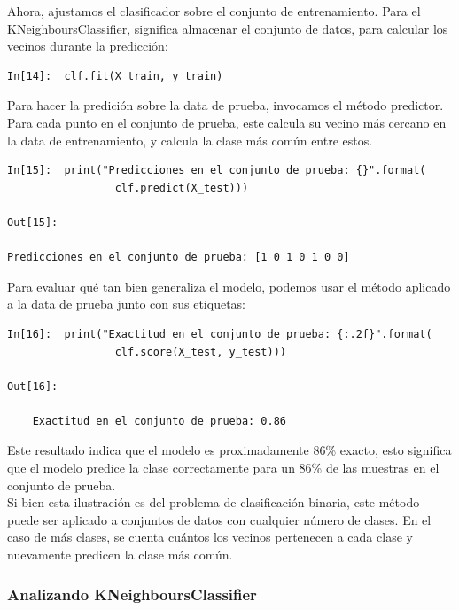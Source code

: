 {Ahora, ajustamos el clasificador sobre el conjunto de entrenamiento. Para el {\ttfamily KNeighboursClassifier}, significa almacenar el conjunto de datos, para  calcular los vecinos durante la predicción:\\

\begin{lstlisting}
In[14]:  clf.fit(X_train, y_train)

\end{lstlisting}

Para hacer la predición sobre la data de prueba, invocamos el método predictor. Para cada punto en el conjunto de prueba, este calcula su vecino más cercano en la data de entrenamiento, y calcula la clase más común entre estos. \\


\begin{lstlisting}
In[15]:  print("Predicciones en el conjunto de prueba: {}".format(
                 clf.predict(X_test)))

Out[15]: 

Predicciones en el conjunto de prueba: [1 0 1 0 1 0 0]

\end{lstlisting}


Para evaluar qué tan bien generaliza el modelo, podemos usar el método { } aplicado a la data de prueba junto con sus etiquetas:\\

\begin{lstlisting}
In[16]:  print("Exactitud en el conjunto de prueba: {:.2f}".format(
                 clf.score(X_test, y_test)))

Out[16]:

    Exactitud en el conjunto de prueba: 0.86
\end{lstlisting}

Este resultado indica que el modelo es proximadamente 86\% exacto, esto significa que el modelo predice la clase correctamente para un  86\%  de las muestras en el conjunto de prueba.\\

 
Si bien esta ilustración es del problema de clasificación binaria, este método puede ser
aplicado a conjuntos de datos con cualquier número de clases. En el caso de  más clases, se cuenta  cuántos
los vecinos pertenecen a cada clase y nuevamente predicen la clase más común.\\


\subsubsection{Analizando KNeighboursClassifier}

}
